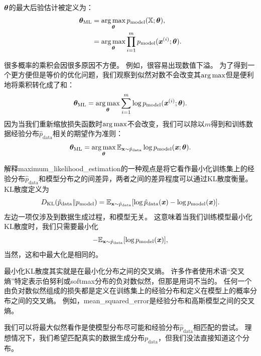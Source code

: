  $\boldsymbol{\theta}$的最大后验估计被定义为：
\begin{align}
    \boldsymbol{\theta}_{\text{ML}} &= \underset{\boldsymbol{\theta}}{\arg\max} \, p_{\text{model}} (\mathbb{X}; \boldsymbol{\theta}), \\
        &= \underset{\boldsymbol{\theta}}{\arg\max} \prod_{i=1}^m p_{\text{model}} (\boldsymbol{\mathit{x}}^{(i)}; \boldsymbol{\theta}).
\end{align}

很多概率的乘积会因很多原因不方便。
例如，很容易出现数值下溢。
为了得到一个更方便但是等价的优化问题，我们观察到似然对数不会改变其$\arg\max$但是便利地将乘积转化成了和：
\begin{equation}
    \boldsymbol{\theta}_{\text{ML}} = \underset{\boldsymbol{\theta}}{\arg\max} \sum_{i=1}^m \log p_{\text{model}} (\boldsymbol{\mathit{x}}^{(i)}; \boldsymbol{\theta}) .
\end{equation}
因为当我们重新缩放损失函数时$\arg\max$不会改变，我们可以除以$m$得到和训练数据经验分布$\hat{p}_{\text{data}}$相关的期望作为准则：
\begin{equation}
\label{eq:5.59}
    \boldsymbol{\theta}_{\text{ML}} = \underset{\boldsymbol{\theta}}{\arg\max} \,\mathbb{E}_{\mathbf{x} \sim \hat{p}_{\text{data}}} \log p_{\text{model}} (\boldsymbol{\mathit{x}}; \boldsymbol{\theta}) .
\end{equation}

解释\gls{maximum_likelihood_estimation}的一种观点是将它看作最小化训练集上的经验分布$\hat{p}_{\text{data}}$和模型分布之的间差异，两者之间的差异程度可以通过KL散度衡量。
KL散度定义为
\begin{equation}
    D_{\text{KL}}(\hat{p}_{\text{data}} \| p_{\text{model}}) = \mathbb{E}_{\mathbf{x} \sim \hat{p}_{\text{data}}} [ \log \hat{p}_{\text{data}}(\boldsymbol{\mathit{x}}) - \log p_{\text{model}}(\boldsymbol{\mathit{x}}) ] .
\end{equation}
左边一项仅涉及到数据生成过程，和模型无关。
这意味着当我们训练模型最小化KL散度时，我们只需要最小化
\begin{equation}
    -\mathbb{E}_{\mathbf{x} \sim \hat{p}_{\text{data}}} [ \log p_{\text{model}}(\boldsymbol{\mathit{x}})  ] ,
\end{equation}
当然，这和中最大化是相同的。


最小化KL散度其实就是在最小化分布之间的交叉熵。
许多作者使用术语“交叉熵”特定表示伯努利或softmax分布的负对数似然，但那是用词不当的。
任何一个由负对数似然组成的损失都是定义在训练集上的经验分布和定义在模型上的概率分布之间的交叉熵。
例如，\gls{mean_squared_error}是经验分布和高斯模型之间的交叉熵。

我们可以将最大似然看作是使模型分布尽可能和经验分布$\hat{p}_{\text{data}}$相匹配的尝试。
理想情况下，我们希望匹配真实的数据生成分布$p_{\text{data}}$，但我们没法直接知道这个分布。

